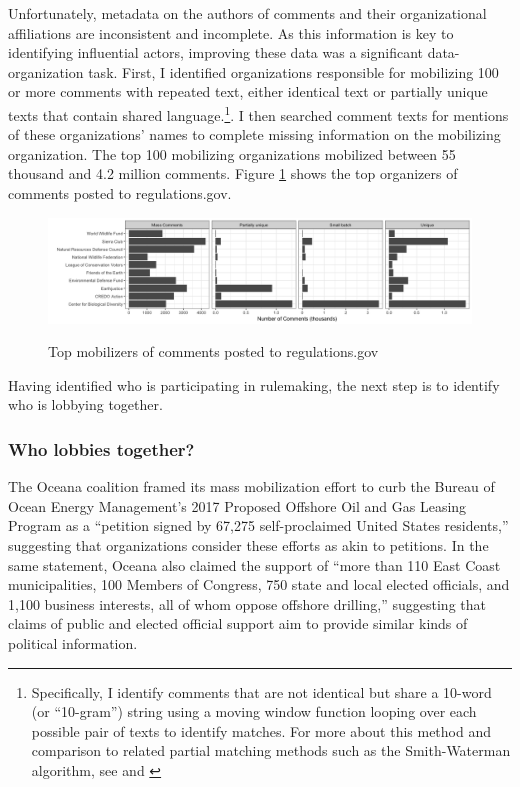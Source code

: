 Unfortunately, metadata on the authors of comments and their organizational affiliations are inconsistent and incomplete. As this information is key to identifying influential actors, improving these data was a significant data-organization task. 
First, I identified organizations responsible for mobilizing 100 or more comments with repeated text, either identical text or partially unique texts that contain shared language.\footnote{Specifically, I identify comments that are not identical but share a 10-word (or ``10-gram'') string using a moving window function looping over each possible pair of texts to identify matches. For more about this method and comparison to related partial matching methods such as the Smith-Waterman algorithm, see \citet{Casas2017} and \citet{Judge-Lord2017}}.
I then searched comment texts for mentions of these organizations' names to complete missing information on the mobilizing organization.
 The top 100 mobilizing organizations mobilized between 55 thousand and 4.2 million comments. Figure \ref{fig:toporgs} shows the top organizers of comments posted to regulations.gov.

\begin{figure}
    \centering
        \caption{Top mobilizers of comments posted to regulations.gov}
    \includegraphics[width = 6.5in]{Figs/toporgs.png}
    \label{fig:toporgs}
\end{figure}

Having identified who is participating in rulemaking, the next step is to identify who is lobbying together.

\subsubsection{Who lobbies together?}
The Oceana coalition framed its mass mobilization effort to curb the  Bureau of Ocean Energy Management's 2017 Proposed Offshore Oil and Gas Leasing Program as a ``petition signed by 67,275 self-proclaimed United States residents,'' suggesting that organizations consider these efforts as akin to petitions. In the same statement, Oceana also claimed the support of ``more than 110 East Coast municipalities, 100 Members of Congress, 750 state and local elected officials, and 1,100 business interests, all of whom oppose offshore drilling,'' suggesting that claims of public and elected official support aim to provide similar kinds of political information. 

